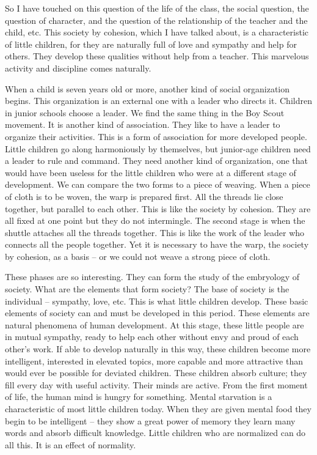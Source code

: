 \documentclass[lang=cn,10pt]{elegantbook}
\begin{document}
So I have touched on this question of the life of the class, the social question, the question of character, and the question of the relationship of the teacher and the child, etc. This society by cohesion, which I have talked about, is a characteristic of little children, for they are naturally full of love and sympathy and help for others. They develop these qualities without help from a teacher. This marvelous activity and discipline comes naturally.

When a child is seven years old or more, another kind of social organization begins. This organization is an external one with a leader who directs it. Children in junior schools choose a leader. We find the same thing in the Boy Scout movement. It is another kind of association. They like to have a leader to organize their activities. This is a form of association for more developed people. Little children go along harmoniously by themselves, but junior-age children need a leader to rule and command. They need another kind of organization, one that would have been useless for the little children who were at a different stage of development. We can compare the two forms to a piece of weaving. When a piece of cloth is to be woven, the warp is prepared first. All the threads lie close together, but parallel to each other. This is like the society by cohesion. They are all fixed at one point but they do not intermingle. The second stage is when the shuttle attaches all the threads together. This is like the work of the leader who connects all the people together. Yet it is necessary to have the warp, the society by cohesion, as a basis – or we could not weave a strong piece of cloth.

These phases are so interesting. They can form the study of the embryology of society. What are the elements that form society? The base of society is the individual – sympathy, love, etc. This is what little children develop. These basic elements of society can and must be developed in this period. These elements are natural phenomena of human development. At this stage, these little people are in mutual sympathy, ready to help each other without envy and proud of each other's work. If able to develop naturally in this way, these
children become more intelligent, interested in elevated topics, more capable and more attractive than would ever be possible for deviated children. These children absorb culture; they fill every day with useful activity. Their minds are active. From the first moment of life, the human mind is hungry for something. Mental starvation is a characteristic of most little children today. When they are given mental food they begin to be intelligent – they show a great power of memory they learn many words and absorb difficult knowledge. Little
children who are normalized can do all this. It is an effect of normality.
\end{document}
